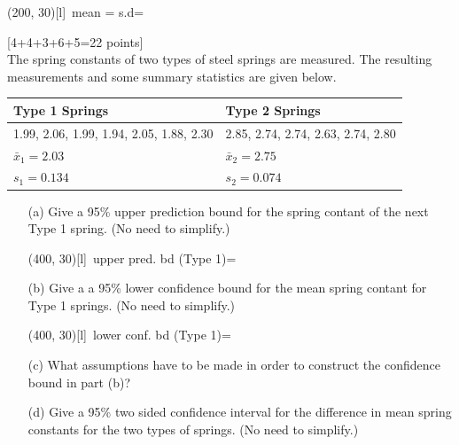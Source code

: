 \documentclass[11pt]{article}
\begin{document}
{\begin{enumerate}
 \hfill
\framebox(200, 30)[l]{\, mean
= \hspace{2cm} s.d=\hspace{2cm}}

\end{enumerate}

\newpage

\hfill[4+4+3+6+5=22 points] \\
%
 The spring constants of two types of steel springs are measured. The resulting measurements and some summary statistics are given below.

\begin{center}
\begin{tabular}{|p{3cm}|p{3cm}|}
\hline
Type 1 Springs  & Type 2 Springs\\
\hline
1.99, 2.06, 1.99, 1.94, 2.05, 1.88, 2.30   & 2.85, 2.74, 2.74, 2.63, 2.74, 2.80\\
$\bar{x}_1 = 2.03$ & $\bar{x}_2 = 2.75$\\
$s_1 = 0.134$ & $s_2 = 0.074$\\
\hline
\end{tabular}
\end{center}

\begin{enumerate}

\item[(a)]  Give a 95\% upper prediction bound for the
spring contant of the next Type 1 spring. (No need to simplify.)



 \hfill \framebox(400, 30)[l]{\, upper pred. bd (Type 1)= \hspace{6cm} }
\vskip 7cm
\item[(b)] Give a a 95\% lower confidence bound for the
mean spring contant for Type 1 springs. (No need to simplify.)


 \hfill \framebox(400, 30)[l]{\, lower conf. bd (Type 1)= \hspace{6cm} }
 \vskip 7cm

\item[(c)] What assumptions have to be made in order to construct the
confidence bound in part (b)?

\vskip 3cm

\item[(d)]  Give a 95\% two sided confidence interval for the
difference in mean spring constants for the two types of springs.
(No need to simplify.)


\end{enumerate}}
\end{document}
